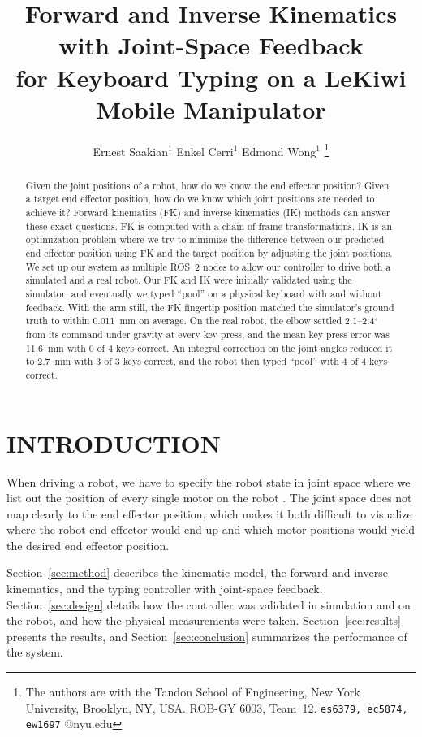 \documentclass[letterpaper, 10 pt, conference]{ieeeconf}
\title{\LARGE \bf
Forward and Inverse Kinematics with Joint-Space Feedback\\
for Keyboard Typing on a LeKiwi Mobile Manipulator
}
\author{Ernest Saakian$^{1}$ Enkel Cerri$^{1}$ Edmond Wong$^{1}$%
\thanks{The authors are with the Tandon School of Engineering, New York University, Brooklyn, NY, USA.
        ROB-GY 6003, Team~12.
        {\tt\small es6379, ec5874, ew1697} @nyu.edu}%
}
\begin{document}
\maketitle
\thispagestyle{empty}
\pagestyle{empty}

\begin{abstract}
Given the joint positions of a robot, how do we know the end effector position?
Given a target end effector position, how do we know which joint positions are needed to achieve it?
Forward kinematics (FK) and inverse kinematics (IK) methods can answer these exact questions.
FK is computed with a chain of frame transformations. IK is an optimization problem where we try to
minimize the difference between our predicted end effector position using FK and the target position by
adjusting the joint positions.
We set up our system as multiple ROS~2 nodes to allow our controller to drive both a simulated and a real robot.
Our FK and IK were initially validated using the simulator, and eventually we typed ``pool'' on a physical keyboard
with and without feedback.
With the arm still, the FK fingertip position matched the simulator's ground truth to within 0.011~mm on average.
On the real robot, the elbow settled 2.1--2.4$^\circ$ from its command under gravity at every key press, and
the mean key-press error was 11.6~mm with 0 of 4 keys correct. An integral correction on the joint angles
reduced it to 2.7~mm with 3 of 3 keys correct, and the robot then typed ``pool'' with 4 of 4 keys correct.
\end{abstract}

\section{INTRODUCTION}
\label{sec:intro}

When driving a robot, we have to specify the robot state in joint space where we list out the position of every single
motor on the robot \cite{c1}. The joint space does not map clearly to the end effector position, which makes it both difficult
to visualize where the robot end effector would end up and which motor positions would yield the desired end
effector position.


Section~\ref{sec:method} describes the kinematic model, the forward and inverse kinematics, and the
typing controller with joint-space feedback. Section~\ref{sec:design} details how the controller was
validated in simulation and on the robot, and how the physical measurements were taken.
Section~\ref{sec:results} presents the results, and Section~\ref{sec:conclusion} summarizes the
performance of the system.
\end{document}
